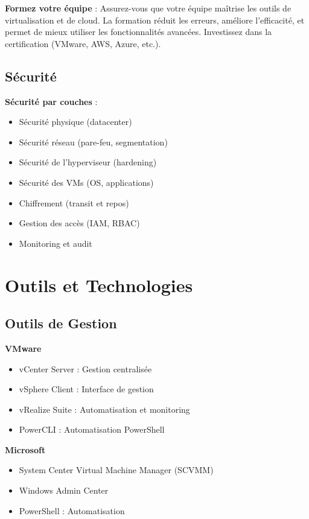 \documentclass[11pt,a4paper]{article}
\begin{document}
\begin{tipbox}
\textbf{Formez votre équipe} : Assurez-vous que votre équipe maîtrise les outils de virtualisation et de cloud. La formation réduit les erreurs, améliore l'efficacité, et permet de mieux utiliser les fonctionnalités avancées. Investissez dans la certification (VMware, AWS, Azure, etc.).
\end{tipbox}

\subsection{Sécurité}

\begin{tipbox}
\textbf{Sécurité par couches} :
\begin{itemize}
    \item Sécurité physique (datacenter)
    \item Sécurité réseau (pare-feu, segmentation)
    \item Sécurité de l'hyperviseur (hardening)
    \item Sécurité des VMs (OS, applications)
    \item Chiffrement (transit et repos)
    \item Gestion des accès (IAM, RBAC)
    \item Monitoring et audit
\end{itemize}
\end{tipbox}

\section{Outils et Technologies}

\subsection{Outils de Gestion}

\textbf{VMware}
\begin{itemize}
    \item vCenter Server : Gestion centralisée
    \item vSphere Client : Interface de gestion
    \item vRealize Suite : Automatisation et monitoring
    \item PowerCLI : Automatisation PowerShell
\end{itemize}

\textbf{Microsoft}
\begin{itemize}
    \item System Center Virtual Machine Manager (SCVMM)
    \item Windows Admin Center
    \item PowerShell : Automatisation
\end{itemize}
\end{document}
